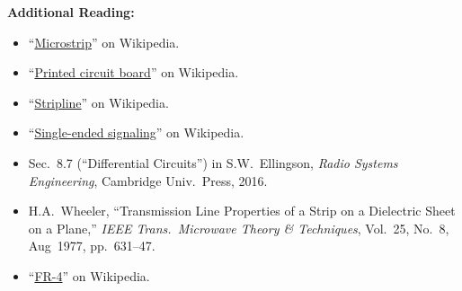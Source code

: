 {\bf Additional Reading:}
\begin{itemize}
\item ``\href{https://en.wikipedia.org/wiki/Microstrip}{Microstrip}'' on Wikipedia.
\item ``\href{https://en.wikipedia.org/wiki/Printed_circuit_board}{Printed circuit board}'' on Wikipedia.
\item ``\href{https://en.wikipedia.org/wiki/Stripline}{Stripline}'' on Wikipedia.
\item ``\href{https://en.wikipedia.org/wiki/Single-ended_signaling}{Single-ended signaling}'' on Wikipedia.
\item Sec.~8.7 (``Differential Circuits'') in S.W.~Ellingson, \emph{Radio Systems Engineering}, Cambridge Univ.\ Press, 2016. 
\item H.A.\ Wheeler, ``Transmission Line Properties of a Strip on a Dielectric Sheet on a Plane,'' {\it IEEE Trans.\ Microwave Theory \& Techniques}, Vol.~25, No.~8, Aug~1977, pp.~631--47. %
\item ``\href{https://en.wikipedia.org/wiki/FR-4}{FR-4}'' on Wikipedia.
\end{itemize}
 


